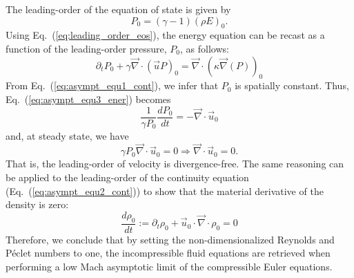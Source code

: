 \documentclass[preprint,10pt]{elsarticle}
\renewcommand{\div}{\vec{\nabla}\! \cdot \!}
\newcommand{\grad}{\vec{\nabla}}
\newcommand{\eqt}[1]{Eq.~(\ref{#1})}                     %
\begin{document}
%
The leading-order of the equation of state is given by 
\begin{equation}
\label{eq:leading_order_eos}
 P_0 = (\gamma - 1) (\rho E)_0 .
\end{equation}
%
Using \eqt{eq:leading_order_eos}, the energy equation can be recast as a function of the leading-order pressure, $P_0$, as follows:
%
\begin{equation}\label{eq:asympt_equ3_ener}
 \partial_t P_0 + \gamma \div \left( \vec{u} P \right)_0 =  \div(\kappa \grad(P))_0
\end{equation}
%
From \eqt{eq:asympt_equ1_cont}, we infer that $P_0$ is spatially constant. Thus, \eqt{eq:asympt_equ3_ener} becomes
%
\begin{equation}
\frac{1}{\gamma P_0} \frac{d P_0}{dt} = - \div \vec{u}_0 
\end{equation}
%
and, at steady state, we have
%
\begin{equation}
\gamma P_0 \div  \vec{u}_0 = 0 \Rightarrow \div  \vec{u}_0 = 0.
\end{equation}
%
That is, the leading-order of velocity is divergence-free. The same reasoning can be applied to the leading-order of the continuity equation (\eqt{eq:asympt_equ2_cont}) to show that the material derivative of the density is zero:
\begin{equation}
\frac{d \rho_0}{dt}:= \partial_t \rho_0 + \vec{u}_0 \cdot \div \rho_0 = 0
\end{equation}
%
Therefore, we conclude that by setting the non-dimensionalized Reynolds and P\'eclet numbers to one, the incompressible fluid equations are retrieved when performing a low Mach asymptotic limit of the compressible Euler equations.
\end{document}
